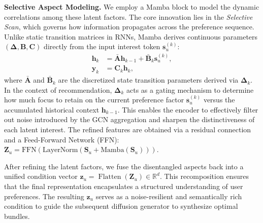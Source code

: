\documentclass[lettersize,journal]{IEEEtran}
\begin{document}
\noindent \textbf{Selective Aspect Modeling.}
We employ a Mamba block to model the dynamic correlations among these latent factors. The core innovation lies in the \textit{Selective Scan}, which governs how information propagates across the preference sequence.
Unlike static transition matrices in RNNs, Mamba derives continuous parameters $(\mathbf{\Delta}, \mathbf{B}, \mathbf{C})$ directly from the input interest token $\mathbf{s}_u^{(k)}$:
\begin{equation}
\label{eq:mamba_core}
\begin{split}
    \mathbf{h}_k &= \bar{\mathbf{A}} \mathbf{h}_{k-1} + \bar{\mathbf{B}}_k \mathbf{s}_u^{(k)}, \\
    \mathbf{y}_k &= \mathbf{C}_k \mathbf{h}_k,
\end{split}
\end{equation}
where $\bar{\mathbf{A}}$ and $\bar{\mathbf{B}}_k$ are the discretized state transition parameters derived via $\mathbf{\Delta}_k$.
In the context of recommendation, $\mathbf{\Delta}_k$ acts as a gating mechanism to determine how much focus to retain on the current preference factor $\mathbf{s}_u^{(k)}$ versus the accumulated historical context $\mathbf{h}_{k-1}$. This enables the encoder to effectively filter out noise introduced by the GCN aggregation and sharpen the distinctiveness of each latent interest.
The refined features are obtained via a residual connection and a Feed-Forward Network (FFN): $\mathbf{Z}_u = \text{FFN}(\text{LayerNorm}(\mathbf{S}_u + \text{Mamba}(\mathbf{S}_u)))$.

After refining the latent factors, we fuse the disentangled aspects back into a unified condition vector $\mathbf{z}_u = \operatorname{Flatten}(\mathbf{Z}_u) \in \mathbb{R}^{d}$. This recomposition ensures that the final representation encapsulates a structured understanding of user preferences.
The resulting $\mathbf{z}_u$ serves as a noise-resilient and semantically rich condition to guide the subsequent diffusion generator to synthesize optimal bundles.
\end{document}
